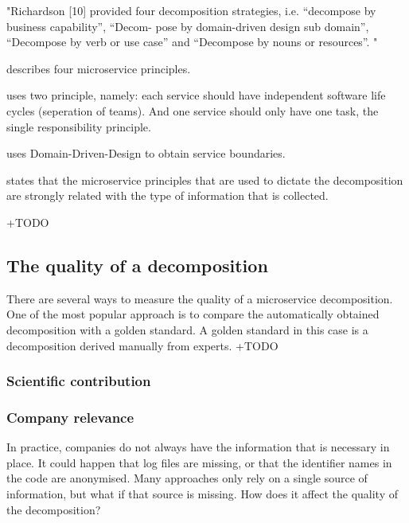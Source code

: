 "Richardson [10] provided four decomposition strategies, i.e. “decompose by business capability”, “Decom- pose by domain-driven design sub domain”, “Decompose by verb or use case” and “Decompose by nouns or resources”. "

\citeauthor{selmadji2018re} \cite{selmadji2018re} describes four microservice principles.

\citeauthor{lohnertz2020steinmetz} \cite{lohnertz2020steinmetz} uses two principle, namely: each service should have independent software life cycles (seperation of teams). And one service should only have one task, the single responsibility principle.

\cite{gysel2016service} uses Domain-Driven-Design to obtain service boundaries.

\citeauthor{nunes2019monolith} \cite{nunes2019monolith} states that the microservice principles that are used to dictate the decomposition are strongly related with the type of information that is collected.

+TODO


\subsection{The quality of a decomposition}\label{ss:quality_decomposition}
There are several ways to measure the quality of a microservice decomposition. One of the most popular approach is to compare the automatically obtained decomposition with a golden standard. A golden standard in this case is a decomposition derived manually from experts. 
+TODO



\subsubsection{Scientific contribution}

\subsubsection{Company relevance}
In practice, companies do not always have the information that is necessary in place. It could happen that log files are missing, or that the identifier names in the code are anonymised. Many approaches only rely on a single source of information, but what if that source is missing. How does it affect the quality of the decomposition? 

